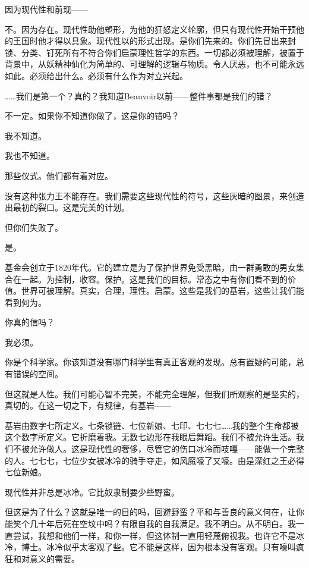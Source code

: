 \begin{scpbox}
因为现代性和前现——

不。因为存在。现代性助他塑形，为他的狂怒定义轮廓，但只有现代性开始干预他的王国时他才得以具象。现代性以的形式出现。是你们先来的。你们先冒出来封锁、分类、钉死所有不符合你们启蒙理性哲学的东西。一切都必须被理解，被置于背景中，从妖精神仙化为简单的、可理解的逻辑与物质。令人厌恶，也不可能永远如此。必须给出什么。必须有什么作为对立兴起。

……我们是第一个？真的？我知道Beauvoir以前——整件事都是我们的错？

不一定。如果你不知道你做了，这是你的错吗？

我不知道。

我也不知道。

那些仪式。他们都有着对应。

没有这种张力王不能存在。我们需要这些现代性的符号，这些灰暗的图景，来创造出最初的裂口。这是完美的计划。

但你们失败了。

是。


基金会创立于1820年代。它的建立是为了保护世界免受黑暗，由一群勇敢的男女集合在一起。为控制，收容。保护。这是我们的目标。常态之中有你们看不到的价值。世界可被理解。真实，合理，理性。启蒙。这些是我们的基岩，这些让我们能看到何为。

你真的信吗？

我必须。

你是个科学家。你该知道没有哪门科学里有真正客观的发现。总有置疑的可能，总有错误的空间。

但这就是人性。我们可能心智不完美，不能完全理解，但我们所观察的是坚实的，真切的。在这一切之下，有规律，有基岩——

基岩由数字七所定义。七条锁链、七位新娘、七印、七七七……我的整个生命都被这个数字所定义。它折磨着我。无数七边形在我眼后舞蹈。我们不被允许生活。我们不被允许做人。这是现代性的奢侈，尽管它的伤口冰冷而吱嘎——能做一个完整的人。七七七，七位少女被冰冷的骑手夺走，如风魔嚎了又嚎。由是深红之王必得七位新娘。

现代性并非总是冰冷。它比奴隶制要少些野蛮。

但这是为了什么？这就是唯一的目的吗，回避野蛮？平和与善良的意义何在，让你能笑个几十年后死在空坟中吗？有限自我的自我满足。我不明白。从不明白。我一直尝试，我想和他们一样，和你一样，但这体制一直用轻蔑俯视我。也许它不是冰冷，博士。冰冷似乎太客观了些。它不能是这样，因为根本没有客观。只有嚎叫疯狂和对意义的需要。


\end{scpbox}
